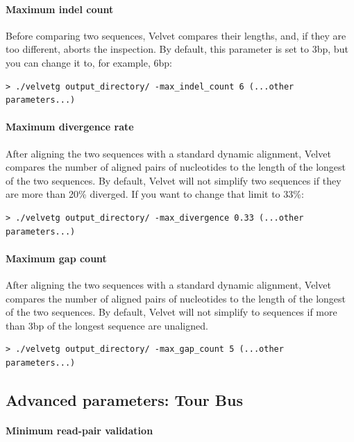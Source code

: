 \documentclass{article}
\begin{document}
\paragraph{Maximum indel count}

Before comparing two sequences, Velvet compares their lengths, and, if they are too different, aborts the inspection. By default, this parameter is set to 3bp, but you can change it to, for example, 6bp:

\begin{verbatim}
> ./velvetg output_directory/ -max_indel_count 6 (...other parameters...)
\end{verbatim} 

\paragraph{Maximum divergence rate}

After aligning the two sequences with a standard dynamic alignment, Velvet compares the number of aligned pairs of nucleotides to the length of the longest of the two sequences. By default, Velvet will not simplify two sequences if they are more than 20\% diverged. If you want to change that limit to 33\%:

\begin{verbatim}
> ./velvetg output_directory/ -max_divergence 0.33 (...other parameters...)
\end{verbatim} 

\paragraph{Maximum gap count}

After aligning the two sequences with a standard dynamic alignment, Velvet compares the number of aligned pairs of nucleotides to the length of the longest of the two sequences. By default, Velvet will not simplify to sequences if more than 3bp of the longest sequence are unaligned.

\begin{verbatim}
> ./velvetg output_directory/ -max_gap_count 5 (...other parameters...)
\end{verbatim} 

\subsection{Advanced parameters: Tour Bus}

\paragraph{Minimum read-pair validation}
\end{document}
